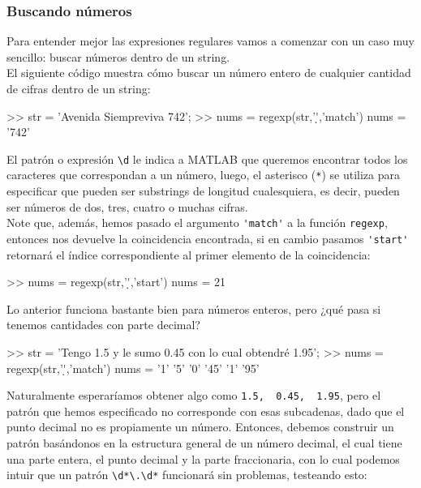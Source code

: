 \subsubsection{Buscando números}\label{buscando-numeros}

Para entender mejor las expresiones regulares vamos a comenzar con un
caso muy sencillo: buscar números dentro de un string. \\

El siguiente código muestra cómo buscar un número entero de cualquier
cantidad de cifras dentro de un string:

\begin{matlab}
>> str = 'Avenida Siempreviva 742';
>> nums = regexp(str,'\d*','match')
nums = 
    '742'
\end{matlab}

El patrón o expresión \verb|\d| le indica a MATLAB que
queremos encontrar todos los caracteres que correspondan a un número,
luego, el asterisco (\texttt{*}) se utiliza para especificar que pueden
ser substrings de longitud cualesquiera, es decir, pueden ser números de
dos, tres, cuatro o muchas cifras. \\

Note que, además, hemos pasado el argumento
\verb|'match'| a la función
\texttt{regexp}, entonces nos devuelve la coincidencia encontrada, si en
cambio pasamos \verb|'start'|
retornará el índice correspondiente al primer elemento de la
coincidencia:

\begin{matlab}
>> nums = regexp(str,'\d*','start')
nums =
    21
\end{matlab}

Lo anterior funciona bastante bien para números enteros, pero ¿qué pasa
si tenemos cantidades con parte decimal?

\begin{matlab}
>> str = 'Tengo 1.5 y le sumo 0.45 con lo cual obtendré 1.95';
>> nums = regexp(str,'\d*','match')
nums = 
    '1'    '5'    '0'    '45'    '1'    '95'
\end{matlab}

Naturalmente esperaríamos obtener algo como
\texttt{\textquotesingle{}1.5\textquotesingle{},\ \ \textquotesingle{}0.45\textquotesingle{},\ \ \textquotesingle{}1.95\textquotesingle{}},
pero el patrón que hemos especificado no corresponde con esas
subcadenas, dado que el punto decimal no es propiamente un número.
Entonces, debemos construir un patrón basándonos en la estructura
general de un número decimal, el cual tiene una parte entera, el punto
decimal y la parte fraccionaria, con lo cual podemos intuir que un
patrón \texttt{\textbackslash{}d*\textbackslash{}.\textbackslash{}d*}
funcionará sin problemas, testeando esto:

